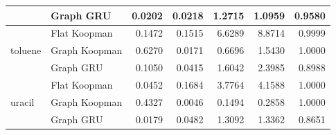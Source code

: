\documentclass{article}
\begin{document}
\begin{table}[htbp]
{\begin{tabular}{llrrrrr}
 & Graph GRU & 0.0202 & 0.0218 & 1.2715 & 1.0959 & 0.9580 \\
\midrule
\multirow{3}{*}{toluene} & Flat Koopman & 0.1472 & 0.1515 & 6.6289 & 8.8714 & 0.9999 \\
 & Graph Koopman & 0.6270 & 0.0171 & 0.6696 & 1.5430 & 1.0000 \\
 & Graph GRU & 0.1050 & 0.0415 & 1.6042 & 2.3985 & 0.8988 \\
\midrule
\multirow{3}{*}{uracil} & Flat Koopman & 0.0452 & 0.1684 & 3.7764 & 4.1588 & 1.0000 \\
 & Graph Koopman & 0.4327 & 0.0046 & 0.1494 & 0.2858 & 1.0000 \\
 & Graph GRU & 0.0179 & 0.0482 & 1.3092 & 1.3362 & 0.8651 \\
\bottomrule
\end{tabular}}
\end{table}
\end{document}
